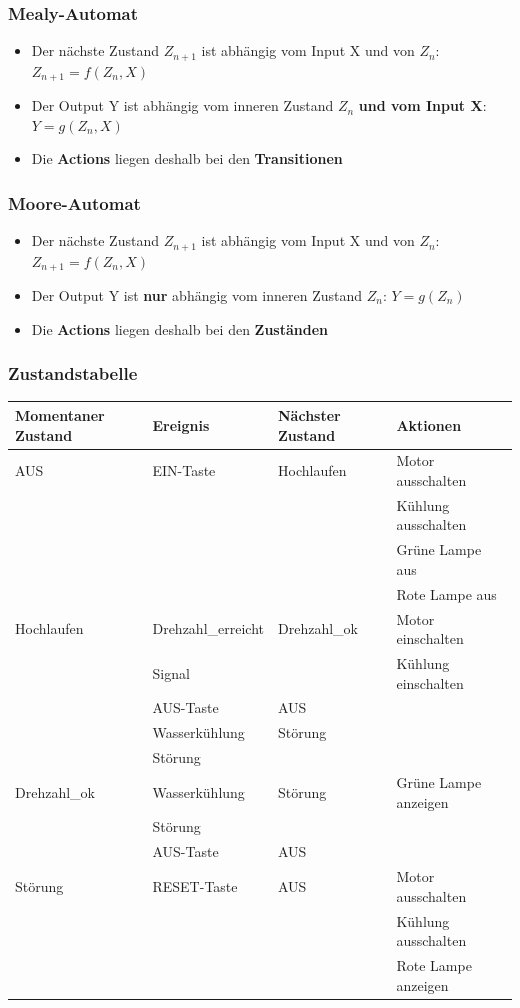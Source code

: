 \subsubsection{Mealy-Automat}
\begin{itemize}
  	\item Der nächste Zustand $Z_{n+1}$ ist abhängig vom Input X und von $Z_n$:
  	$Z_{n+1}=f(Z_n,X)$
  	\item Der Output Y ist abhängig vom inneren Zustand $Z_n$ \textbf{und vom
 	 Input X}: $Y=g(Z_n, X)$
  	\item Die \textbf{Actions} liegen deshalb bei den \textbf{Transitionen}
\end{itemize}

\subsubsection{Moore-Automat}
\begin{itemize}
	\item Der nächste Zustand $Z_{n+1}$ ist abhängig vom Input X und von $Z_n$:
  	$Z_{n+1}=f(Z_n,X)$
  	\item Der Output Y ist \textbf{nur} abhängig vom inneren Zustand $Z_n$: $Y=g(Z_n)$
  	\item Die \textbf{Actions} liegen deshalb bei den \textbf{Zuständen}
\end{itemize}


\subsubsection{Zustandstabelle}

\renewcommand{\arraystretch}{1}
\begin{tabular}{|l|l|l|l|}
\hline
\textbf{Momentaner Zustand}&\textbf{Ereignis}&\textbf{Nächster
Zustand}&\textbf{Aktionen}\\
\hline
AUS&EIN-Taste&Hochlaufen&Motor ausschalten\\
&&&Kühlung ausschalten\\&&&Grüne Lampe aus\\&&&Rote Lampe aus\\
\hline
Hochlaufen&Drehzahl\_erreicht&Drehzahl\_ok&Motor einschalten\\
&Signal&&Kühlung einschalten\\ \cline{2-3}
&AUS-Taste&AUS&\\\cline{2-3}
&Wasserkühlung&Störung&\\
&Störung&&\\
\hline
Drehzahl\_ok&Wasserkühlung&Störung&Grüne Lampe anzeigen\\
&Störung&&\\ \cline{2-3}
&AUS-Taste&AUS&\\
\hline
Störung&RESET-Taste&AUS&Motor ausschalten\\
&&&Kühlung ausschalten\\&&&Rote Lampe anzeigen\\
\hline
\end{tabular}
\renewcommand{\arraystretch}{1.8}

